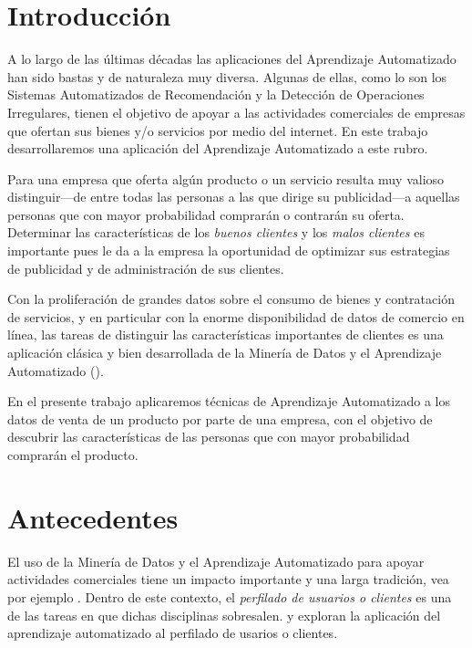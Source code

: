 \documentclass[letterpaper,11pt]{article}
\begin{document}
\begin{multicols}{2}
\section{Introducción}
A lo largo de las últimas décadas las aplicaciones del Aprendizaje Automatizado han sido bastas y de
naturaleza muy diversa. Algunas de ellas, como lo son los Sistemas Automatizados de Recomendación y la Detección de
Operaciones Irregulares, tienen el objetivo de apoyar a las actividades comerciales de empresas que ofertan
sus bienes y/o servicios por medio del internet. En este trabajo desarrollaremos una aplicación del Aprendizaje
Automatizado a este rubro.

Para una empresa que oferta algún producto o un servicio resulta muy valioso distinguir---de entre todas
las personas a las que dirige su publicidad---a aquellas personas que con mayor probabilidad comprarán o
contrarán su oferta. Determinar las características de los \emph{buenos clientes} y los \emph{malos clientes} es importante pues 
le da a la empresa la oportunidad de optimizar sus estrategias de publicidad y de administración de sus clientes. 

Con la proliferación de grandes datos sobre el consumo de bienes y contratación de servicios, y en particular con la enorme
disponibilidad de datos de comercio en línea, las tareas de distinguir las características importantes de clientes es
una aplicación clásica y bien desarrollada de la Minería de Datos y el Aprendizaje Automatizado (\cite[Cap. I]{berry}).  

En el presente trabajo aplicaremos técnicas de Aprendizaje Automatizado a los datos de venta de un producto por parte de una empresa, 
con el objetivo de descubrir las características de las personas que con mayor probabilidad comprarán el producto. 


\section{Antecedentes}
El uso de la Minería de Datos y el Aprendizaje Automatizado para apoyar actividades comerciales tiene un impacto
importante y una larga tradición, vea por ejemplo \cite{berry}\cite{big}.  Dentro de este contexto, el 
\emph{perfilado de usuarios o clientes} es una de las tareas en que dichas disciplinas sobresalen.
\cite{faw}\cite{discov}\cite{mah}\cite{chen} y \cite{segmen} exploran la aplicación del aprendizaje automatizado al
perfilado de usarios o clientes.


\end{multicols}
\end{document}
